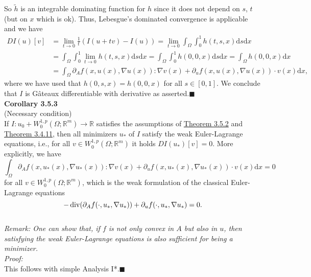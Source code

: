 So $\tilde{h}$ is an integrable dominating function for $h$ since it does not depend on $s$, $t$ (but on $x$ which is ok). Thus, Lebesgue's dominated convergence is applicable and we have
\begin{align*}
	DI(u)[v]&=\lim_{t\to0}{\frac{1}{t}(I(u+tv)-I(u))}=\lim_{t\to0}{\int_\Omega{\int_0^1{h(t,s,x)\mathrm{d}s}\mathrm{d}x}}\\
	&=\int_\Omega{\int_0^1{\lim_{t\to0}{h(t,s,x)}\mathrm{d}s}\mathrm{d}x}=\int_\Omega{\int_0^1{h(0,0,x)\mathrm{d}s}\mathrm{d}x}=\int_\Omega{h(0,0,x)\mathrm{d}x}\\
	&=\int_\Omega{\partial_Af(x,u(x),\nabla u(x)):\nabla v(x)+\partial_uf(x,u(x),\nabla u(x))\cdot v(x)\mathrm{d}x},
\end{align*}
where we have used that $h(0,s,x)=h(0,0,x)$ for all $s\in[0,1]$. We conclude that $I$ is G\^ateaux differentiable with derivative as asserted.\hfill$\blacksquare$\\[11pt]

\textbf{Corollary 3.5.3}\\
(Necessary condition)\\
If $I:u_0+W_0^{1,p}(\Omega;\mathbb{R}^m)\longrightarrow\mathbb{R}$ satisfies the assumptions of \hyperlink{theorem_3_5_2}{Theorem 3.5.2} and \hyperlink{theorem_3_4_11}{Theorem 3.4.11}, then all minimizers $u_*$ of $I$ satisfy the weak Euler-Lagrange equations, i.e., for all $v\in W_0^{1,p}(\Omega;\mathbb{R}^m)$ it holds $DI(u_*)[v]=0$. More explicitly, we have
\[\int_\Omega{\partial_Af(x,u_*(x),\nabla u_*(x)):\nabla v(x)+\partial_uf(x,u_*(x),\nabla u_*(x))\cdot v(x)\mathrm{d}x}=0\]
for all $v\in W_0^{1,p}(\Omega;\mathbb{R}^m)$, which is the weak formulation of the classical Euler-Lagrange equations
\[-\operatorname{div}\mathopen{}\left(\partial_Af(\cdot,u_*,\nabla u_*)\right)\mathclose{}+\partial_uf(\cdot,u_*,\nabla u_*)=0.\]\\

\textit{Remark: One can show that, if $f$ is not only convex in $A$ but also in $u$, then satisfying the weak Euler-Lagrange equations is also sufficient for being a minimizer.}\\

\textit{Proof:}\\
This follows with simple Analysis I*.\hfill$\blacksquare$\\[11pt]

